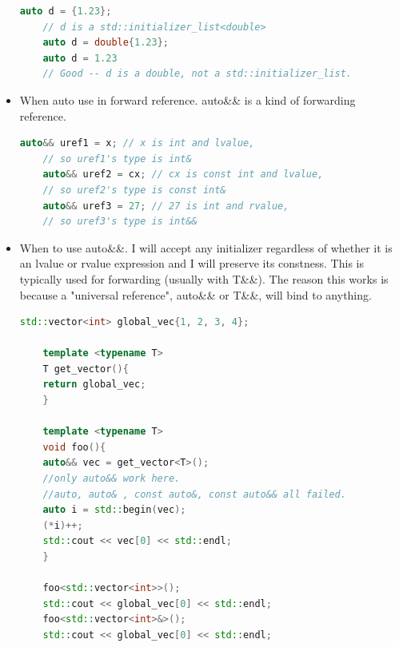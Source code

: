 \documentclass[a4paper,12pt,twoside]{book}
\begin{document}
\begin{itemize}
	\begin{lstlisting}[frame=single, language=c++]
	auto d = {1.23};
	// d is a std::initializer_list<double>
	auto d = double{1.23};
	auto d = 1.23
	// Good -- d is a double, not a std::initializer_list.
	\end{lstlisting}
	
	\item When auto use in forward reference. auto\&\& is a kind of forwarding reference.
	\begin{lstlisting}[frame=single, language=c++]
	auto&& uref1 = x; // x is int and lvalue,
	// so uref1's type is int&
	auto&& uref2 = cx; // cx is const int and lvalue,
	// so uref2's type is const int&
	auto&& uref3 = 27; // 27 is int and rvalue,
	// so uref3's type is int&&
	\end{lstlisting}
	
	\item When to use auto\&\&. I will accept any initializer regardless of whether it is an lvalue or rvalue expression and I will preserve its constness. This is typically used for forwarding (usually with T\&\&). The reason this works is because a "universal reference", auto\&\& or T\&\&, will bind to anything. 
	\begin{lstlisting}[frame=single, language=c++]
	std::vector<int> global_vec{1, 2, 3, 4};
	
	template <typename T>
	T get_vector(){
	return global_vec;
	}
	
	template <typename T>
	void foo(){
	auto&& vec = get_vector<T>(); 
	//only auto&& work here. 
	//auto, auto& , const auto&, const auto&& all failed.
	auto i = std::begin(vec);
	(*i)++;
	std::cout << vec[0] << std::endl;
	}
	
	foo<std::vector<int>>();
	std::cout << global_vec[0] << std::endl;
	foo<std::vector<int>&>();
	std::cout << global_vec[0] << std::endl;
	
	\end{lstlisting}
	
\end{itemize}
\end{document}
